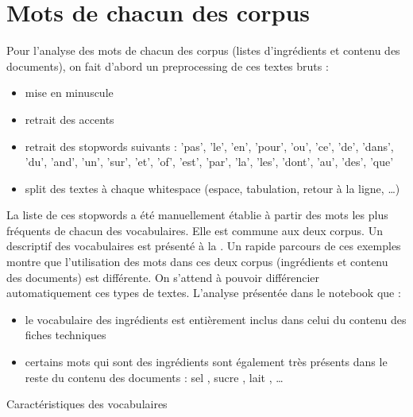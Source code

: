         \section{Mots de chacun des corpus}

        Pour l'analyse des mots de chacun des corpus (listes d'ingrédients et contenu des documents), on fait d'abord un preprocessing de ces textes bruts :
        \begin{itemize}
            \item mise en minuscule
            \item retrait des accents
            \item retrait des stopwords suivants : {'pas', 'le', 'en', 'pour', 'ou', 'ce', 'de', 'dans', 'du', 'and', 'un', 'sur', 'et', 'of', 'est', 'par', 'la', 'les', 'dont', 'au', 'des', 'que'}
            \item split des textes à chaque whitespace (espace, tabulation, retour à la ligne, \dots)
        \end{itemize}
        La liste de ces stopwords a été manuellement établie à partir des mots les plus fréquents de chacun des vocabulaires.
        Elle est commune aux deux corpus.
        Un descriptif des vocabulaires est présenté à la .
        Un rapide parcours de ces exemples montre que l'utilisation des mots dans ces deux corpus (ingrédients et contenu des documents) est différente.
        On s'attend à pouvoir différencier automatiquement ces types de textes.
        L'analyse présentée dans le notebook que :
        \begin{itemize}
            \item le vocabulaire des ingrédients est entièrement inclus dans celui du contenu des fiches techniques
            \item certains mots qui sont des ingrédients sont également très présents dans le reste du contenu des documents : \og sel \fg, \og sucre \fg, \og lait \fg, \dots
        \end{itemize}
        
        {\renewcommand{\arraystretch}{1.5}%
        \begin{table}[htbp]
            \begin{center}
            {\scriptsize
            
            }
            \caption{Caractéristiques des vocabulaires}
            \label{tbl:vocabularies}
            \end{center}
        \end{table}
        }

